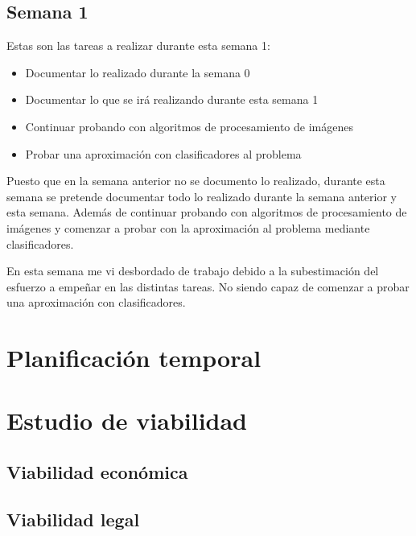 \subsection{Semana 1}
Estas son las tareas a realizar durante esta semana 1:

\begin{itemize}
	\item Documentar lo realizado durante la semana 0
	\item Documentar lo que se irá realizando durante esta semana 1
	\item Continuar probando con algoritmos de procesamiento de imágenes
	\item Probar una aproximación con clasificadores al problema
\end{itemize}

Puesto que en la semana anterior no se documento lo realizado, durante esta semana se pretende documentar todo lo realizado durante la semana anterior y esta semana. Además de continuar probando con algoritmos de procesamiento de imágenes y comenzar a probar con la aproximación al problema mediante clasificadores.

En esta semana me vi desbordado de trabajo debido a la subestimación del esfuerzo a empeñar en las distintas tareas. No siendo capaz de comenzar a probar una aproximación con clasificadores.

\begin{comment}
\begin{figure}[h]
\centering
\texttt{[image: semana\_0]}
\caption{Burndown de la semana 0}
\label{fig:A.1.1}
\end{figure}
\end{comment}


\section{Planificación temporal}

\section{Estudio de viabilidad}

\subsection{Viabilidad económica}

\subsection{Viabilidad legal}



